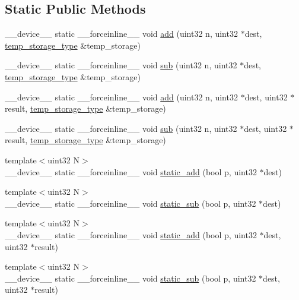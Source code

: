 \subsection*{Static Public Methods}
\begin{DoxyCompactItemize}
\item 
\+\_\+\+\_\+device\+\_\+\+\_\+ static \+\_\+\+\_\+forceinline\+\_\+\+\_\+ void \hyperlink{structcugar_1_1cuda_1_1warp__atomic_ab8efedd6b0ff805ea98e2c0f50954d96}{add} (uint32 n, uint32 $\ast$dest, \hyperlink{structcugar_1_1cuda_1_1warp__atomic_1_1temp__storage__type}{temp\+\_\+storage\+\_\+type} \&temp\+\_\+storage)
\item 
\+\_\+\+\_\+device\+\_\+\+\_\+ static \+\_\+\+\_\+forceinline\+\_\+\+\_\+ void \hyperlink{structcugar_1_1cuda_1_1warp__atomic_aabfa766cac8d60cfaa1aab753df361e1}{sub} (uint32 n, uint32 $\ast$dest, \hyperlink{structcugar_1_1cuda_1_1warp__atomic_1_1temp__storage__type}{temp\+\_\+storage\+\_\+type} \&temp\+\_\+storage)
\item 
\+\_\+\+\_\+device\+\_\+\+\_\+ static \+\_\+\+\_\+forceinline\+\_\+\+\_\+ void \hyperlink{structcugar_1_1cuda_1_1warp__atomic_a10f2954d921d4cad97af46747cc5b8d9}{add} (uint32 n, uint32 $\ast$dest, uint32 $\ast$result, \hyperlink{structcugar_1_1cuda_1_1warp__atomic_1_1temp__storage__type}{temp\+\_\+storage\+\_\+type} \&temp\+\_\+storage)
\item 
\+\_\+\+\_\+device\+\_\+\+\_\+ static \+\_\+\+\_\+forceinline\+\_\+\+\_\+ void \hyperlink{structcugar_1_1cuda_1_1warp__atomic_a99e3bd26ab9d6e49fb11b5ed312dbf82}{sub} (uint32 n, uint32 $\ast$dest, uint32 $\ast$result, \hyperlink{structcugar_1_1cuda_1_1warp__atomic_1_1temp__storage__type}{temp\+\_\+storage\+\_\+type} \&temp\+\_\+storage)
\item 
{\footnotesize template$<$uint32 N$>$ }\\\+\_\+\+\_\+device\+\_\+\+\_\+ static \+\_\+\+\_\+forceinline\+\_\+\+\_\+ void \hyperlink{structcugar_1_1cuda_1_1warp__atomic_ab4ae31ba6d02a13bcf6b96f2651ef338}{static\+\_\+add} (bool p, uint32 $\ast$dest)
\item 
{\footnotesize template$<$uint32 N$>$ }\\\+\_\+\+\_\+device\+\_\+\+\_\+ static \+\_\+\+\_\+forceinline\+\_\+\+\_\+ void \hyperlink{structcugar_1_1cuda_1_1warp__atomic_a72348133348e50f6a722b5513f5769ee}{static\+\_\+sub} (bool p, uint32 $\ast$dest)
\item 
{\footnotesize template$<$uint32 N$>$ }\\\+\_\+\+\_\+device\+\_\+\+\_\+ static \+\_\+\+\_\+forceinline\+\_\+\+\_\+ void \hyperlink{structcugar_1_1cuda_1_1warp__atomic_af9e6927616daac2937ec18fc55f965e3}{static\+\_\+add} (bool p, uint32 $\ast$dest, uint32 $\ast$result)
\item 
{\footnotesize template$<$uint32 N$>$ }\\\+\_\+\+\_\+device\+\_\+\+\_\+ static \+\_\+\+\_\+forceinline\+\_\+\+\_\+ void \hyperlink{structcugar_1_1cuda_1_1warp__atomic_a1ccd0be98a221671e345dba6d62de49e}{static\+\_\+sub} (bool p, uint32 $\ast$dest, uint32 $\ast$result)
\end{DoxyCompactItemize}


